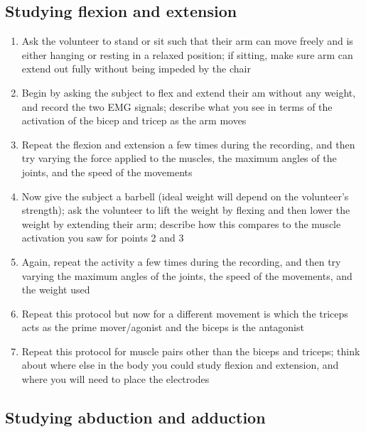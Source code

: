 \documentclass{article}
\begin{document}
\subsection{Studying flexion and extension}

\begin{enumerate}
\item Ask the volunteer to stand or sit such that their arm can move freely and is either hanging or resting in a relaxed position; if sitting, make sure arm can extend out fully without being impeded by the chair
\item Begin by asking the subject to flex and extend their am without any weight, and record the two EMG signals; describe what you see in terms of the activation of the bicep and tricep as the arm moves
\item Repeat the flexion and extension a few times during the recording, and then try varying the force applied to the muscles, the maximum angles of the joints, and the speed of the movements
\item Now give the subject a barbell (ideal weight will depend on the volunteer's strength); ask the volunteer to lift the weight by flexing and then lower the weight by extending their arm; describe how this compares to the muscle activation you saw for points 2 and 3
\item Again, repeat the activity a few times during the recording, and then try varying the maximum angles of the joints, the speed of the movements, and the weight used
\item Repeat this protocol but now for a different movement is which the triceps acts as the prime mover/agonist and the biceps is the antagonist
\item Repeat this protocol for muscle pairs other than the biceps and triceps; think about where else in the body you could study flexion and extension, and where you will need to place the electrodes
\end{enumerate}

\subsection{Studying abduction and adduction}
\end{document}

